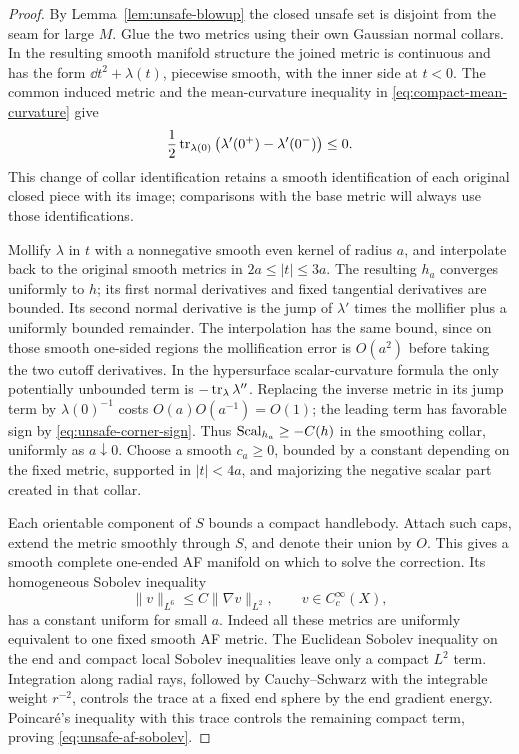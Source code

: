 \begin{proof}
By Lemma~\ref{lem:unsafe-blowup} the closed unsafe set is disjoint
from the seam for large \(M\).  Glue the two metrics using their
own Gaussian normal collars.  In the resulting smooth manifold
structure the joined metric is continuous and has the form
\(\dd t^2+\lambda(t)\), piecewise smooth, with the inner side
at \(t<0\).  The common induced metric and the mean-curvature
inequality in \eqref{eq:compact-mean-curvature} give
\begin{equation}
 \frac12\operatorname{tr}_{\lambda(0)}
              \big(\lambda'(0^+)-\lambda'(0^-)\big)\le0.
 \label{eq:unsafe-corner-sign}
\end{equation}
This change of collar identification retains a smooth identification
of each original closed piece with its image; comparisons with the
base metric will always use those identifications.

Mollify \(\lambda\) in \(t\) with a nonnegative smooth even
kernel of radius \(a\), and interpolate back to the original
smooth metrics in \(2a\le|t|\le3a\).  The resulting \(h_a\)
converges uniformly to \(h\); its first normal derivatives and
fixed tangential derivatives are bounded.  Its second normal
derivative is the jump of \(\lambda'\) times the mollifier plus
a uniformly bounded remainder.  The interpolation has the same
bound, since on those smooth one-sided regions the mollification
error is \(O(a^2)\) before taking the two cutoff derivatives.
In the hypersurface scalar-curvature formula the only potentially
unbounded term is \(-\operatorname{tr}_\lambda\lambda''\).  Replacing the
inverse metric in its jump term by \(\lambda(0)^{-1}\) costs
\(O(a)O(a^{-1})=O(1)\); the leading term has favorable sign by
\eqref{eq:unsafe-corner-sign}.  Thus \(\operatorname{Scal}_{h_a}\ge-C(h)\)
in the smoothing collar, uniformly as \(a\downarrow0\).
Choose a smooth \(c_a\ge0\), bounded by a constant depending
on the fixed metric, supported in \(|t|<4a\), and majorizing
the negative scalar part created in that collar.

Each orientable component of \(S\) bounds a compact handlebody.
Attach such caps, extend the metric smoothly through \(S\), and
denote their union by \(O\).  This gives a smooth complete
one-ended AF manifold on which to solve the correction.  Its
homogeneous Sobolev inequality
\begin{equation}
 \|v\|_{L^6}\le C\|\nabla v\|_{L^2},
       \qquad v\in C_c^\infty(X),
 \label{eq:unsafe-af-sobolev}
\end{equation}
has a constant uniform for small \(a\).  Indeed all these metrics
are uniformly equivalent to one fixed smooth AF metric.  The
Euclidean Sobolev inequality on the end and compact local Sobolev
inequalities leave only a compact \(L^2\) term.  Integration
along radial rays, followed by Cauchy--Schwarz with the integrable
weight \(r^{-2}\), controls the trace at a fixed end sphere by
the end gradient energy.  Poincar\'e's inequality with this trace
controls the remaining compact term, proving
\eqref{eq:unsafe-af-sobolev}.


\end{proof}
